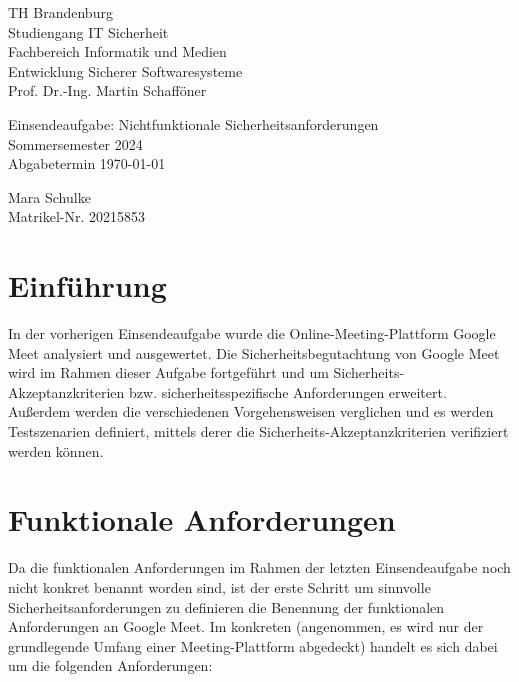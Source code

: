 \documentclass{article}
\begin{document}
\begin{titlepage}
	\begin{flushleft}
		TH Brandenburg \\
		Studiengang IT Sicherheit \\
		Fachbereich Informatik und Medien \\
		Entwicklung Sicherer Softwaresysteme \\
		Prof. Dr.-Ing. Martin Schafföner
	\end{flushleft}

	\vfill

	\begin{center}
		\Large{Einsendeaufgabe: Nichtfunktionale Sicherheitsanforderungen}\\[0.5em]
		\large{Sommersemester 2024}\\[0.25em]
		\large{Abgabetermin \today}
	\end{center}

	\vfill

	\begin{flushright}
		Mara Schulke \\
		Matrikel-Nr. 20215853
	\end{flushright}
\end{titlepage}

\tableofcontents

\listoffigures

\section{Einführung}

In der vorherigen Einsendeaufgabe wurde die Online-Meeting-Plattform Google Meet 
analysiert und ausgewertet. Die Sicherheitsbegutachtung von Google Meet wird im Rahmen 
dieser Aufgabe fortgeführt und um Sicherheits-Akzeptanzkriterien bzw. 
sicherheitsspezifische Anforderungen erweitert. Außerdem werden die verschiedenen 
Vorgehensweisen verglichen und es werden Testszenarien definiert, mittels derer die 
Sicherheits-Akzeptanzkriterien verifiziert werden können.

\section{Funktionale Anforderungen}

Da die funktionalen Anforderungen im Rahmen der letzten Einsendeaufgabe noch nicht konkret 
benannt worden sind, ist der erste Schritt um sinnvolle Sicherheitsanforderungen zu 
definieren die Benennung der funktionalen Anforderungen an Google Meet. Im konkreten 
(angenommen, es wird nur der grundlegende Umfang einer Meeting-Plattform abgedeckt) 
handelt es sich dabei um die folgenden Anforderungen:
\end{document}
